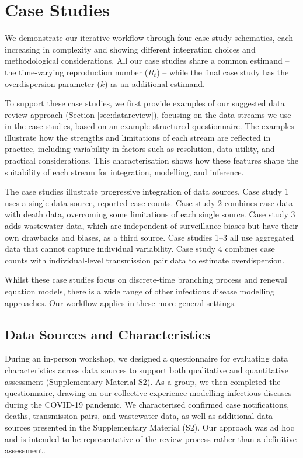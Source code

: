 \documentclass{article}
\begin{document}
\section{Case Studies}
\label{sec:casestudies}

We demonstrate our iterative workflow through four case study schematics, each increasing in complexity and showing different integration choices and methodological considerations. All our case studies share a common estimand -- the time-varying reproduction number ($R_t$) -- while the final case study has the overdispersion parameter ($k$) as an additional estimand.

To support these case studies, we first provide examples of our suggested data review approach (Section \ref{sec:datareview}), focusing on the data streams we use in the case studies, based on an example structured questionnaire.
The examples illustrate how the strengths and limitations of each stream are reflected in practice, including variability in factors such as resolution, data utility, and practical considerations. This characterisation shows how these features shape the suitability of each stream for integration, modelling, and inference.

The case studies illustrate progressive integration of data sources.
Case study 1 uses a single data source, reported case counts.
Case study 2 combines case data with death data, overcoming some limitations of each single source. Case study 3 adds wastewater data, which are independent of surveillance biases but have their own drawbacks and biases, as a third source. Case studies 1--3 all use aggregated data that cannot capture individual variability. Case study 4 combines case counts with individual-level transmission pair data to estimate overdispersion.

Whilst these case studies focus on discrete-time branching process and renewal equation models, there is a wide range of other infectious disease modelling approaches. Our workflow applies in these more general settings.

\subsection{Data Sources and Characteristics}

During an in-person workshop, we designed a questionnaire for evaluating data characteristics across data sources to support both qualitative and quantitative assessment (Supplementary Material S2).
As a group, we then completed the questionnaire, drawing on our collective experience modelling infectious diseases during the COVID-19 pandemic.
We characterised confirmed case notifications, deaths, transmission pairs, and wastewater data, as well as additional data sources presented in the Supplementary Material (S2). Our approach was ad hoc and is intended to be representative of the review process rather than a definitive assessment.
\end{document}

